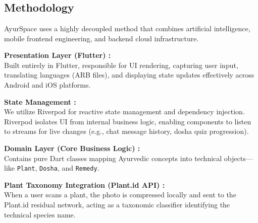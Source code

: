 \documentclass[12pt, a4paper]{report}
\begin{document}
\chapter[Plan Of Project]{}
\titleformat{\chapter}[display]{\vspace{1cm}\normalfont\Large\bfseries\centering}{\chaptertitlename\ \thechapter}{20pt}{\vspace{0pt}}
\titlespacing*{\chapter}{0pt}{-50pt}{20pt}
\section{Methodology}
\justify

AyurSpace uses a highly decoupled method that combines artificial intelligence, mobile frontend engineering, and backend cloud infrastructure. 

\item[$\bullet$]\textbf{ Presentation Layer (Flutter) :}\\ Built entirely in Flutter, responsible for UI rendering, capturing user input, translating languages (ARB files), and displaying state updates effectively across Android and iOS platforms.

\item[$\bullet$]\textbf{ State Management :}\\ We utilize Riverpod for reactive state management and dependency injection. Riverpod isolates UI from internal business logic, enabling components to listen to streams for live changes (e.g., chat message history, dosha quiz progression).

\item[$\bullet$]\textbf{ Domain Layer (Core Business Logic) :}\\ Contains pure Dart classes mapping Ayurvedic concepts into technical objects—like \texttt{Plant}, \texttt{Dosha}, and \texttt{Remedy}. 

\item[$\bullet$]\textbf{ Plant Taxonomy Integration (Plant.id API) :  }\\When a user scans a plant, the photo is compressed locally and sent to the Plant.id residual network, acting as a taxonomic classifier identifying the technical species name.
\end{document}
